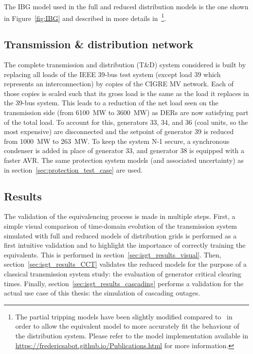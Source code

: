 The IBG model used in the full and reduced distribution models is the one shown in Figure~\ref{fig:IBG} and described in more details in~\cite{ChaspierreThesis}\footnote{The partial tripping models have been slightly modified compared to~\cite{ChaspierreThesis} in order to allow the equivalent model to more accurately fit the behaviour of the distribution system. Please refer to the model implementation available in \url{https://fredericsabot.github.io/Publications.html} for more information.}.

\subsection{Transmission \& distribution network}
\label{sec:isgt_TD}

The complete transmission and distribution (T\&D) system considered is built by replacing all loads of the IEEE 39-bus test system (except load 39 which represents an interconnection) by copies of the CIGRE MV network. Each of those copies is scaled such that its gross load is the same as the load it replaces in the 39-bus system. This leads to a reduction of the net load seen on the transmission side (from 6100~MW to 3600~MW) as DERs are now satisfying part of the total load. To account for this, generators 33, 34, and 36 (coal units, so the most expensive) are disconnected and the setpoint of generator 39 is reduced from 1000~MW to 263~MW. To keep the system N-1 secure, a synchronous condenser is added in place of generator 33, and generator 38 is equipped with a faster AVR. The same protection system models (and associated uncertainty) as in section~\ref{sec:protection_test_case} are used.

\subsection{Results}
\label{sec:isgt_results}

The validation of the equivalencing process is made in multiple steps. First, a simple visual comparison of time-domain evolution of the transmission system simulated with full and reduced models of distribution grids is performed as a first intuitive validation and to highlight the importance of correctly training the equivalents. This is performed in section~\ref{sec:isgt_results_visual}. Then, section~\ref{sec:isgt_results_CCT} validates the reduced models for the purpose of a classical transmission system study: the evaluation of generator critical clearing times. Finally, section~\ref{sec:isgt_results_cascading} performs a validation for the actual use case of this thesis: the simulation of cascading outages.


